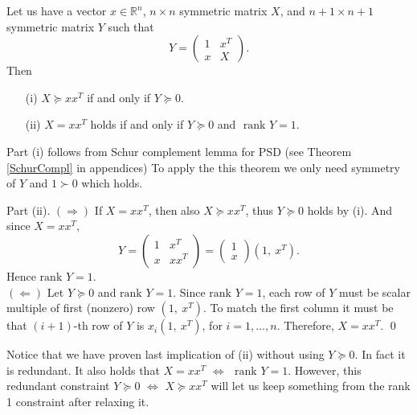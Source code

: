 \documentclass[10pt,oneside]{book}
\theoremstyle{definition}
\begin{document}
\lema Let us have a vector $x\in \mathbb{R}^n$, $n\times n$ symmetric matrix $X$, and $n+1\times n+1$ symmetric matrix $Y$ such that 
$$Y =  \left(
\begin{array}{cc}
1 & x^T \\
x & X
\end{array}\right). 
$$  Then
\begin{itemize}
\item[(i)] $X\succeq xx^T$ if and only if $Y\succeq 0$.
\item[(ii)] $X=xx^T$ holds if and only if $Y\succeq 0$ and \rm $\mbox{ rank } Y=1$. 
\end{itemize}
\proof Part (i) follows from Schur complement lemma for PSD (see Theorem \ref{SchurCompl} in appendices) To apply the this theorem we only need symmetry of $Y$ and $1\succ 0$ which holds. 

Part (ii). $(\Rightarrow)$ If $X=xx^T$, then also $X\succeq xx^T$, thus $Y\succeq 0$ holds by (i). And since $X=xx^T$,
$$Y=\left(
\begin{array}{cc}
1 & x^T\\
x & xx^T
\end{array}\right)
=  \left(\begin{array}{c}
1\\
x
\end{array}\right)
(1,\ x^T).
$$
Hence $\mbox{rank } Y=1$.\\
$(\Leftarrow)$ Let $Y\succeq 0$ and $\mbox{rank } Y=1$. Since $\mbox{rank } Y=1$, each row of $Y$ must be scalar multiple of first (nonzero) row $(1,\ x^T)$. To match the first column 
it must be that $(i+1)$-th row of $Y$ is $x_i(1,\ x^T)$, for $i=1,\dots , n$.
Therefore, $X=xx^T.$
\qed

\rem Notice that we have proven last implication of (ii) without using $Y\succeq 0$. In fact it is redundant. It also holds that $X=xx^T$ $\Leftrightarrow$ $\mbox{ rank } Y=1$. 
However, this redundant constraint $Y\succeq 0$ $\Leftrightarrow$ $X\succeq xx^T$ will let us keep something from the rank 1 constraint after relaxing it.
\end{document}
